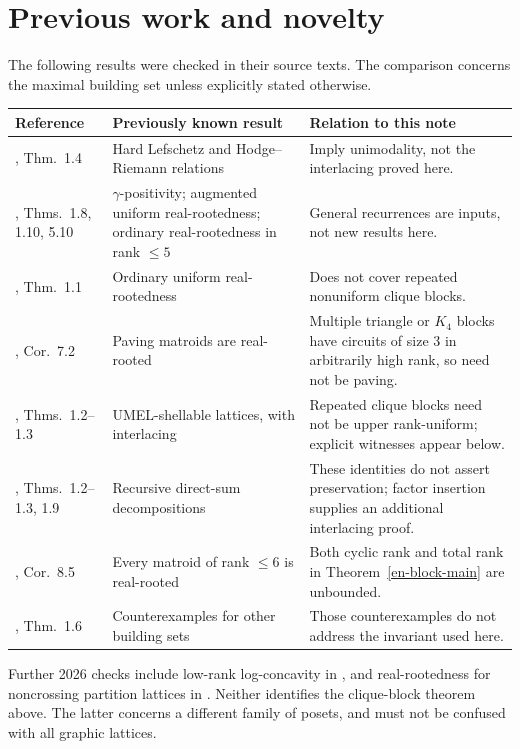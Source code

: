 \documentclass[12pt]{amsart}
\theoremstyle{definition}
\theoremstyle{remark}
\numberwithin{equation}{section}
\begin{document}
\section{Previous work and novelty}
The following results were checked in their source texts. The comparison concerns the maximal building set unless explicitly stated otherwise.
\begin{center}\small
\begin{tabular}{p{2.6cm}p{5.1cm}p{5.4cm}}
\toprule
Reference & Previously known result & Relation to this note\\\midrule
\cite{AHK18}, Thm.~1.4 & Hard Lefschetz and Hodge--Riemann relations & Imply unimodality, not the interlacing proved here.\\
\cite{FMSV24}, Thms.~1.8, 1.10, 5.10 & $\gamma$-positivity; augmented uniform real-rootedness; ordinary real-rootedness in rank $\leq5$ & General recurrences are inputs, not new results here.\\
\cite{BV26}, Thm.~1.1 & Ordinary uniform real-rootedness & Does not cover repeated nonuniform clique blocks.\\
\cite{BVTN25}, Cor.~7.2 & Paving matroids are real-rooted & Multiple triangle or $K_4$ blocks have circuits of size $3$ in arbitrarily high rank, so need not be paving.\\
\cite{CFL25}, Thms.~1.2--1.3 & UMEL-shellable lattices, with interlacing & Repeated clique blocks need not be upper rank-uniform; explicit witnesses appear below.\\
\cite{Pie25}, Thms.~1.2--1.3, 1.9 & Recursive direct-sum decompositions & These identities do not assert preservation; factor insertion supplies an additional interlacing proof.\\
\cite{CFL26}, Cor.~8.5 & Every matroid of rank $\leq6$ is real-rooted & Both cyclic rank and total rank in Theorem~\ref{en-block-main} are unbounded.\\
\cite{EFMPV26}, Thm.~1.6 & Counterexamples for other building sets & Those counterexamples do not address the invariant used here.\\\bottomrule
\end{tabular}
\end{center}
Further 2026 checks include low-rank log-concavity in \cite{SV26}, and real-rootedness for noncrossing partition lattices in \cite{Alex26}. Neither identifies the clique-block theorem above. The latter concerns a different family of posets, and must not be confused with all graphic lattices.
\end{document}
